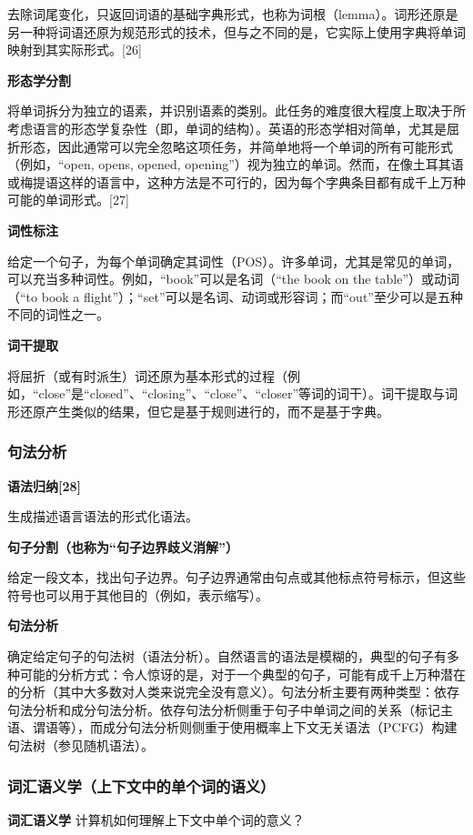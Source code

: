 去除词尾变化，只返回词语的基础字典形式，也称为词根（lemma）。词形还原是另一种将词语还原为规范形式的技术，但与之不同的是，它实际上使用字典将单词映射到其实际形式。[26]

\textbf{形态学分割}  

将单词拆分为独立的语素，并识别语素的类别。此任务的难度很大程度上取决于所考虑语言的形态学复杂性（即，单词的结构）。英语的形态学相对简单，尤其是屈折形态，因此通常可以完全忽略这项任务，并简单地将一个单词的所有可能形式（例如，“open, opens, opened, opening”）视为独立的单词。然而，在像土耳其语或梅提语这样的语言中，这种方法是不可行的，因为每个字典条目都有成千上万种可能的单词形式。[27]

\textbf{词性标注}  

给定一个句子，为每个单词确定其词性（POS）。许多单词，尤其是常见的单词，可以充当多种词性。例如，“book”可以是名词（“the book on the table”）或动词（“to book a flight”）；“set”可以是名词、动词或形容词；而“out”至少可以是五种不同的词性之一。

\textbf{词干提取}  

将屈折（或有时派生）词还原为基本形式的过程（例如，“close”是“closed”、“closing”、“close”、“closer”等词的词干）。词干提取与词形还原产生类似的结果，但它是基于规则进行的，而不是基于字典。

\subsubsection{句法分析}
\textbf{语法归纳[28]}  

生成描述语言语法的形式化语法。

\textbf{句子分割（也称为“句子边界歧义消解”）} 

给定一段文本，找出句子边界。句子边界通常由句点或其他标点符号标示，但这些符号也可以用于其他目的（例如，表示缩写）。

\textbf{句法分析}  

确定给定句子的句法树（语法分析）。自然语言的语法是模糊的，典型的句子有多种可能的分析方式：令人惊讶的是，对于一个典型的句子，可能有成千上万种潜在的分析（其中大多数对人类来说完全没有意义）。句法分析主要有两种类型：依存句法分析和成分句法分析。依存句法分析侧重于句子中单词之间的关系（标记主语、谓语等），而成分句法分析则侧重于使用概率上下文无关语法（PCFG）构建句法树（参见随机语法）。
\subsubsection{词汇语义学（上下文中的单个词的语义）}

\textbf{词汇语义学}  
计算机如何理解上下文中单个词的意义？

